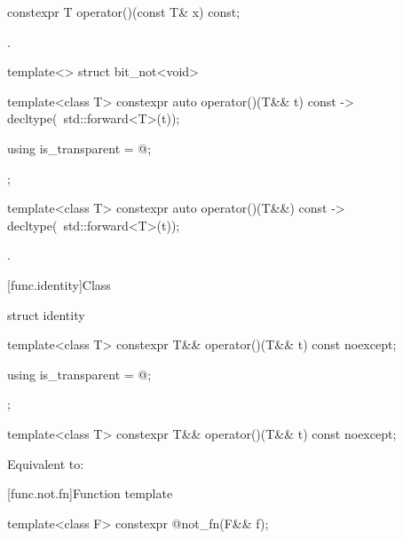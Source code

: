 %
\begin{itemdecl}
constexpr T operator()(const T& x) const;
\end{itemdecl}

\begin{itemdescr}
\pnum
\returns
{}.
\end{itemdescr}

%
\begin{itemdecl}
template<> struct bit_not<void> {
  template<class T> constexpr auto operator()(T&& t) const
    -> decltype(~std::forward<T>(t));

  using is_transparent = @\unspec@;
};
\end{itemdecl}

%
\begin{itemdecl}
template<class T> constexpr auto operator()(T&&) const
    -> decltype(~std::forward<T>(t));
\end{itemdecl}

\begin{itemdescr}
\pnum
\returns
{}.
\end{itemdescr}


[func.identity]{Class }

%
\begin{itemdecl}
struct identity {
  template<class T>
    constexpr T&& operator()(T&& t) const noexcept;

  using is_transparent = @\unspec@;
};

template<class T>
  constexpr T&& operator()(T&& t) const noexcept;
\end{itemdecl}

\begin{itemdescr}
\pnum
\effects
Equivalent to: 
\end{itemdescr}


[func.not.fn]{Function template }

%
\begin{itemdecl}
template<class F> constexpr @\unspec@ not_fn(F&& f);
\end{itemdecl}

